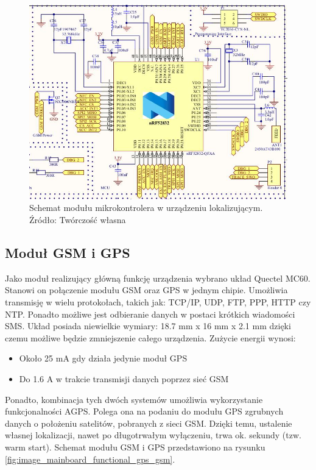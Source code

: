 \begin{figure}[H]
	\centering
	\includegraphics[width=15cm]{img/schematics/mainboard_functional_mcu.jpg}
	\caption{Schemat modułu mikrokontrolera w urządzeniu lokalizującym. \\ Źródło: Twórczość własna}
	\label{fig:image_mainboard_functional_mcu}
\end{figure}

\subsection{Moduł GSM i GPS}

Jako moduł realizujący główną funkcję urządzenia wybrano układ Quectel MC60. Stanowi on połączenie modułu GSM oraz GPS w jednym chipie. Umożliwia transmisję w wielu protokołach, takich jak: TCP/IP, UDP, FTP, PPP, HTTP czy NTP. Ponadto możliwe jest odbieranie danych w postaci krótkich wiadomości SMS. Układ posiada niewielkie wymiary: 18.7 mm x 16 mm x 2.1 mm dzięki czemu możliwe będzie zmniejszenie całego urządzenia. Zużycie energii wynosi:
\begin{itemize}
\item Około 25 mA gdy działa jedynie moduł GPS
\item Do 1.6 A w trakcie transmisji danych poprzez sieć GSM
\end{itemize}

Ponadto, kombinacja tych dwóch systemów umożliwia wykorzystanie funkcjonalności AGPS. Polega ona na podaniu do modułu GPS zgrubnych danych o położeniu satelitów, pobranych z sieci GSM. Dzięki temu, ustalenie własnej lokalizacji, nawet po długotrwałym wyłączeniu, trwa ok. sekundy (tzw. warm start). Schemat modułu GSM i GPS przedstawiono na rysunku \ref{fig:image_mainboard_functional_gps_gsm}.

